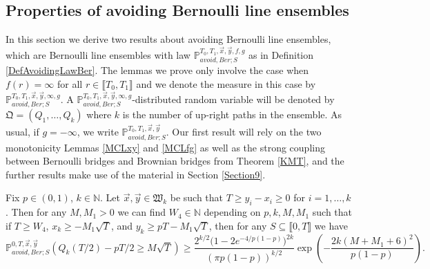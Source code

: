 %
\subsection{Properties of avoiding Bernoulli line ensembles}\label{Section3.3}  In this section we derive two results about avoiding Bernoulli line ensembles, which are Bernoulli line ensembles with law $\mathbb{P}_{avoid, Ber;
S}^{T_0,T_1, \vec{x}, \vec{y}, f, g}$ as in Definition \ref{DefAvoidingLawBer}. The lemmas we prove only involve the case when $f(r) = \infty$ for all $r \in \llbracket T_0, T_1 \rrbracket$ and we denote the measure in this case by $\mathbb{P}_{avoid, Ber;S}^{T_0,T_1, \vec{x}, \vec{y}, \infty, g}$. A $\mathbb{P}_{avoid, Ber;S}^{T_0,T_1, \vec{x}, \vec{y}, \infty, g}$-distributed random variable will be denoted by $\mathfrak{Q} = (Q_1, \dots, Q_k)$ where $k$ is the number of up-right paths in the ensemble. As usual, if $g=-\infty$, we write $\mathbb{P}_{avoid, Ber;S}^{T_0,T_1, \vec{x}, \vec{y}}$. Our first result will rely on the two monotonicity Lemmas \ref{MCLxy} and \ref{MCLfg} as well as the strong coupling between Bernoulli bridges and Brownian bridges from Theorem \ref{KMT}, and the further results make use of the material in Section \ref{Section9}.


\begin{lemma}\label{prob19}
	Fix $p\in(0,1)$, $k\in\mathbb{N}$. Let $\vec{x},\vec{y}\in\mathfrak{W}_k$ be such that $T \geq y_i - x_i \geq 0$ for $i=1,\dots,k$. Then for any $M,M_1 > 0$ we can find $W_4\in\mathbb{N}$ depending on $p,k,M,M_1$ such that if $T\geq W_4$, $x_k \geq - M_1\sqrt{T}$, and $y_k \geq pT - M_1\sqrt{T}$, then for any $S\subseteq \llbracket 0,T\rrbracket$ we have
	\begin{equation}\label{19ineq}
	\mathbb{P}^{0,T,\vec{x},\vec{y}}_{avoid, Ber; S}\left(Q_k(T/2) - pT/2 \geq M\sqrt{T}\right) \geq \frac{2^{k/2}\big(1-2e^{-4/p(1-p)}\big)^{2k}}{(\pi p(1-p))^{k/2}}\exp\left(-\frac{2k(M+M_1+6)^2}{p(1-p)}\right).
	\end{equation}
\end{lemma}

